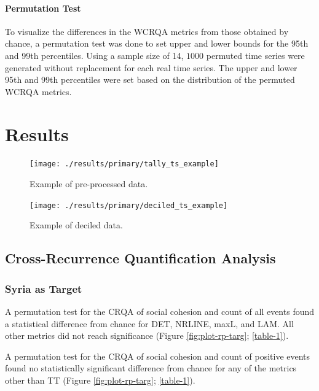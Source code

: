 \documentclass[english,man]{apa6}
\begin{document}
\hypertarget{permutation-test-1}{%
\paragraph{Permutation Test}\label{permutation-test-1}}

To visualize the differences in the WCRQA metrics from those obtained by chance,
a permutation test was done to set upper and lower bounds for the 95th and 99th
percentiles. Using a sample size of 14, \(1000\) permuted time series were
generated without replacement for each real time series. The upper and lower
95th and 99th percentiles were set based on the distribution of the permuted
WCRQA metrics.

\hypertarget{results}{%
\section{Results}\label{results}}

\begin{figure}
\texttt{[image: ./results/primary/tally\_ts\_example]} \caption{Example of pre-processed data.}\label{fig:raw-ts}
\end{figure}

\begin{figure}
\texttt{[image: ./results/primary/deciled\_ts\_example]} \caption{Example of deciled data.}\label{fig:deciled-ts}
\end{figure}

\hypertarget{cross-recurrence-quantification-analysis-1}{%
\subsection{Cross-Recurrence Quantification Analysis}\label{cross-recurrence-quantification-analysis-1}}

\hypertarget{syria-as-target}{%
\subsubsection{Syria as Target}\label{syria-as-target}}

A permutation test for the CRQA of social cohesion and count of all events found
a statistical difference from chance for DET, NRLINE, maxL, and LAM. All other
metrics did not reach significance (Figure \ref{fig:plot-rp-targ};
\autoref{table-1}).

A permutation test for the CRQA of social cohesion and count of positive events
found no statistically significant difference from chance for any of the metrics
other than TT (Figure \ref{fig:plot-rp-targ}; \autoref{table-1}).
\end{document}
